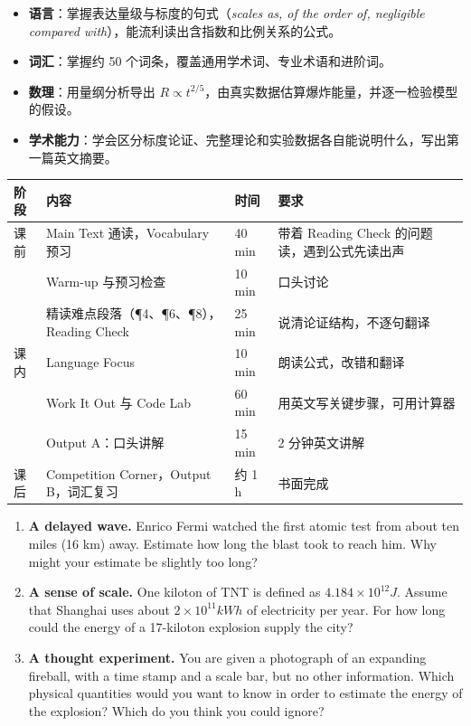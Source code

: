 \documentclass[11pt,a4paper]{article}
\begin{document}

\begin{itemize}
  \item \textbf{语言}：掌握表达量级与标度的句式（\textit{scales as, of the order of, negligible compared with}），能流利读出含指数和比例关系的公式。
  \item \textbf{词汇}：掌握约 50 个词条，覆盖通用学术词、专业术语和进阶词。
  \item \textbf{数理}：用量纲分析导出 $R\propto t^{2/5}$，由真实数据估算爆炸能量，并逐一检验模型的假设。
  \item \textbf{学术能力}：学会区分标度论证、完整理论和实验数据各自能说明什么，写出第一篇英文摘要。
\end{itemize}

\begin{center}
\small
\begin{tabular}{p{1.2cm}p{5.8cm}p{1.4cm}p{6.3cm}}
\toprule
\headrow 阶段 & 内容 & 时间 & 要求 \\
\midrule
课前 & Main Text 通读，Vocabulary 预习 & 40 min & 带着 Reading Check 的问题读，遇到公式先读出声 \\
\midrule
\multirow{5}{*}{课内} & Warm-up 与预习检查 & 10 min & 口头讨论 \\
 & 精读难点段落（¶4、¶6、¶8），Reading Check & 25 min & 说清论证结构，不逐句翻译 \\
 & Language Focus & 10 min & 朗读公式，改错和翻译 \\
 & Work It Out 与 Code Lab & 60 min & 用英文写关键步骤，可用计算器 \\
 & Output A：口头讲解 & 15 min & 2 分钟英文讲解 \\
\midrule
课后 & Competition Corner，Output B，词汇复习 & 约 1 h & 书面完成 \\
\bottomrule
\end{tabular}
\end{center}

\begin{enumerate}[label=\textbf{\arabic*.}]
  \item \textbf{A delayed wave.} Enrico Fermi watched the first atomic test from about ten miles (16 km) away. Estimate how long the blast took to reach him. Why might your estimate be slightly too long?
  \item \textbf{A sense of scale.} One kiloton of TNT is defined as $4.184\times10^{12}\unit{J}$. Assume that Shanghai uses about $2\times10^{11}\unit{kWh}$ of electricity per year. For how long could the energy of a 17-kiloton explosion supply the city?
  \item \textbf{A thought experiment.} You are given a photograph of an expanding fireball, with a time stamp and a scale bar, but no other information. Which physical quantities would you want to know in order to estimate the energy of the explosion? Which do you think you could ignore?
\end{enumerate}
\end{document}
